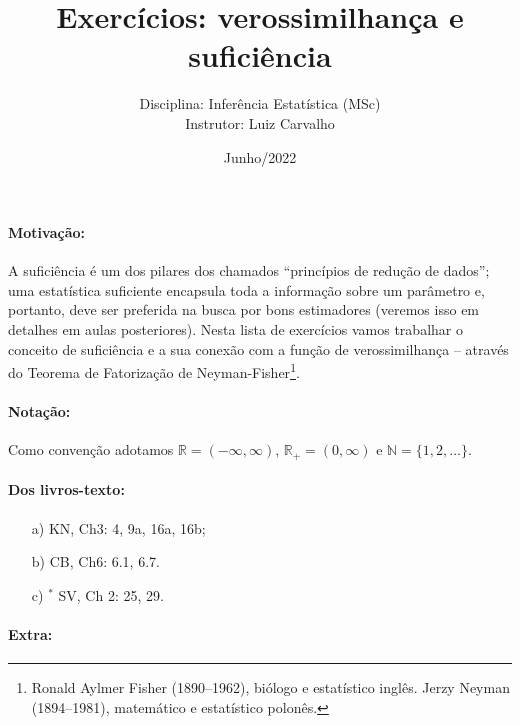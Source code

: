 \documentclass[a4paper,10pt, notitlepage]{report}
\title{Exercícios: verossimilhança e suficiência}
\author{Disciplina: Inferência Estatística (MSc) \\ Instrutor: Luiz Carvalho}
\date{Junho/2022}
\newcommand{\rpl}{\mathbb{R}_+}
\begin{document}
\maketitle

\paragraph{Motivação:}
A suficiência é um dos pilares dos chamados ``princípios de redução de dados''; uma estatística suficiente encapsula toda a informação sobre um parâmetro e, portanto, deve ser preferida na busca por bons estimadores (veremos isso em detalhes em aulas posteriores).
Nesta lista de exercícios vamos trabalhar o conceito de suficiência e a sua conexão com a função de verossimilhança -- através do Teorema de Fatorização de Neyman-Fisher\footnote{Ronald Aylmer Fisher (1890--1962), biólogo e estatístico inglês. Jerzy Neyman (1894--1981), matemático e estatístico polonês.}.

\paragraph{Notação:} Como convenção adotamos $\mathbb{R} = (-\infty, \infty)$, $\rpl = (0, \infty)$ e $\mathbb{N} = \{1, 2, \ldots \}$.

\paragraph{Dos livros-texto:}

\begin{itemize}
    \item[a)] KN, Ch3: 4, 9a, 16a, 16b;
    \item[b)] CB, Ch6: 6.1, 6.7.
    \item[c)] $^\ast$ SV, Ch 2: 25, 29. 
\end{itemize}


\paragraph{Extra:}
\end{document}
